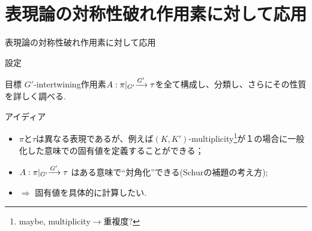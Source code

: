 \documentclass[pdf,notes]{beamer}
\renewcommand{\implies}{\Rightarrow}
\begin{document}
\section{表現論の対称性破れ作用素に対して応用}
\newcommand{\mysbo}{A:\pi\kern-0.1cm\mid_{G'}\xrightarrow{G'}\tau}
{
	\begin{frame}{表現論の対称性破れ作用素に対して応用}
	\begin{block}{設定}
		
	\centerline{
		\xymatrixcolsep{0.5pc}
		\xymatrixrowsep{1pc}
		}
	\end{block}
	\hspace{1cm}
	\vspace{-0.5cm}
	\begin{block}{目標}
		$G'$-intertwining作用素$\mysbo$を全て構成し、分類し、さらにその性質を詳しく調べる.
	\end{block}
\end{frame}
\begin{frame}{アイディア}
	\begin{itemize}%
		\item $\pi$と$\tau$は異なる表現であるが、例えば$(K,K')$-multiplicity\footnote{maybe, multiplicity$\to$重複度?}が１の場合に一般化した意味での固有値を定義することができる；
		\item $\mysbo$ はある意味で``対角化''できる(Schurの補題の考え方);
		\item $\implies$ 固有値を具体的に計算したい.
	\end{itemize}
\end{frame}
}
\end{document}
